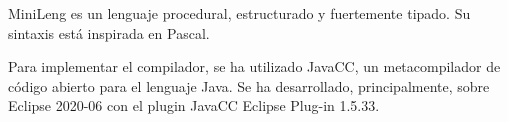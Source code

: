 \documentclass[a4paper,10pt]{article}
\begin{document}
MiniLeng es un lenguaje procedural, estructurado y fuertemente tipado. Su sintaxis está inspirada en Pascal.

Para implementar el compilador, se ha utilizado JavaCC, un metacompilador de código abierto para el lenguaje Java.
Se ha desarrollado, principalmente, sobre Eclipse 2020-06 con el plugin JavaCC Eclipse Plug-in 1.5.33.



\pagebreak

\tableofcontents

\pagebreak

\setcounter{page}{1}

\pagestyle{fancy}









\renewcommand\appendixname{Anexo}
\begin{appendices}


\end{appendices}

\clearpage{}
\newpage
\nocite{*}
\printbibliography
\end{document}
